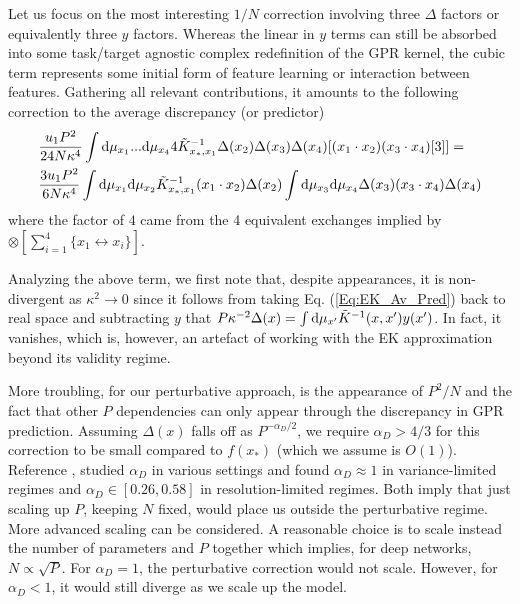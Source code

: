 Let us focus on the most interesting $1/N$ correction involving three $\Delta$ factors or equivalently three $y$ factors. Whereas the linear in $y$ terms can still be absorbed into some task/target agnostic complex redefinition of the GPR kernel, the cubic term represents some initial form of feature learning or interaction between features. Gathering all relevant contributions, it amounts to the following correction to the average discrepancy (or predictor) 
\begin{align}
\label{Eq:1stOrderCorrection}
&\frac{u_1 P^2}{24 N\kappa^4}\int \text{d} \mu_{x_1}... \text{d}\mu_{x_4} 4 \tilde{K}^{-1}_{x_*,x_1} \Delta(x_2)\Delta(x_3)\Delta(x_4)[(x_1 \cdot x_2) (x_3 \cdot x_4)[3]] = \\ \nonumber 
& \frac{3u_1P^2}{6 N\kappa^{4}}\int  \text{d}\mu_{x_1} \text{d}\mu_{x_2} \tilde{K}^{-1}_{x_*,x_1} (x_1 \cdot x_2)\Delta(x_2) \int  \text{d}\mu_{x_3}  \text{d}\mu_{x_4} \Delta(x_3) (x_3 \cdot x_4) \Delta(x_4)
\end{align}
where the factor of $4$ came from the 4 equivalent exchanges implied by $\otimes [\sum_{i=1}^4 \{ x_1 \leftrightarrow x_i\}]$.

Analyzing the above term, we first note that, despite appearances, it is non-divergent as $\kappa^2 \rightarrow 0$ since it follows from taking Eq. (\ref{Eq:EK_Av_Pred}) back to real space and subtracting $y$ that  $P\kappa^{-2} \Delta(x) =\int  \text{d}\mu_{x'} \tilde{K}^{-1}(x,x')y(x')$. In fact, it vanishes, which is, however, an artefact of working with the EK approximation beyond its validity regime. 

More troubling, for our perturbative approach, is the appearance of $P^2/N$ and the fact that other $P$ dependencies can only appear through the discrepancy in GPR prediction. Assuming $\Delta(x)$ falls off as $P^{-\alpha_D/2}$, we require $\alpha_D > 4/3$ for this correction to be small compared to $f(x_*)$ (which we assume is $O(1)$). Reference \cite{Bahri2024Explaining}, studied $\alpha_D$ in various settings and found $\alpha_D\approx 1$ in variance-limited regimes and $\alpha_D \in [0.26,0.58]$ in resolution-limited regimes. Both imply that just scaling up $P$, keeping $N$ fixed, would place us outside the perturbative regime. More advanced scaling can be considered. A reasonable choice is to scale instead the number of parameters and $P$ together which implies, for deep networks, $N \propto \sqrt{P}$. For $\alpha_D=1$, the perturbative correction would not scale. However, for $\alpha_D<1$, it would still diverge as we scale up the model. 


